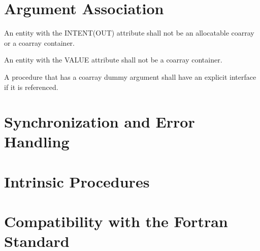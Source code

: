 \section{Argument Association}
\label{sec:Argument Association}

\begin{Constraints F}
\item An entity with the INTENT(OUT) attribute shall not be
an allocatable coarray or a coarray container.

\item An entity with the VALUE attribute shall not be a 
coarray container. %

\item A procedure that has a coarray dummy argument 
shall have an explicit interface if it is referenced. %

\end{Constraints F}

\section{Synchronization and Error Handling}
\label{sec:Synchronization and Error Handling}

\section{Intrinsic Procedures}
\label{sec:Intrinsic Procedures}

\section{Compatibility with the Fortran Standard}
\label{sec:Compatibility with the Fortran Standard}

